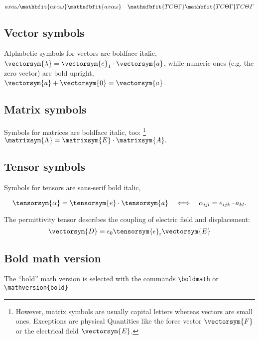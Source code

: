 \documentclass[a4paper]{article}
\renewcommand*{\vec}{\vectorsym}
\begin{document}
$
\mathnormal  {a x \alpha \omega}
\mathbfit    {a x \alpha \omega}
\mathsfbfit{a x \alpha \omega}
\quad
\mathsfbfit{T C \Theta \Gamma}
\mathbfit    {T C \Theta \Gamma}
\mathnormal  {T C \Theta \Gamma}
$

\subsection*{Vector symbols}

Alphabetic symbols for vectors are boldface italic,
$\vec{\lambda}=\vec{e}_{1}\cdot\vec{a}$,
while numeric ones (e.g. the zero vector) are bold upright,
$\vec{a} + \vec{0} = \vec{a}$.

\subsection*{Matrix symbols}

Symbols for matrices are boldface italic, too:%
\footnote{However, matrix symbols are usually capital letters whereas vectors
are small ones. Exceptions are physical Quantities like the force
vector $\vec{F}$ or the electrical field $\vec{E}$.%
}
$\matrixsym{\Lambda}=\matrixsym{E}\cdot\matrixsym{A}.$


\subsection*{Tensor symbols}

Symbols for tensors are sans-serif bold italic,

\[
   \tensorsym{\alpha}  =  \tensorsym{e}\cdot\tensorsym{a}
   \quad \Longleftrightarrow \quad
   \alpha_{ijl}  =  e_{ijk}\cdot a_{kl}.
\]


The permittivity tensor describes the coupling of electric field and
displacement: \[
\vec{D}=\epsilon_{0}\tensorsym{\epsilon}_{\mathrm{r}}\vec{E}\]


\subsection*{Bold math version}

The ``bold'' math version is selected with the commands
\verb+\boldmath+ or \verb+\mathversion{bold}+
\boldmath
\end{document}
